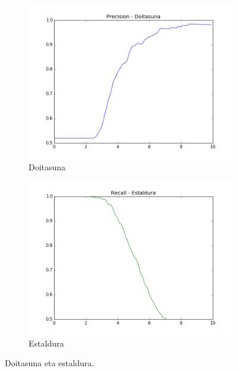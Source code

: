 \documentclass[information,article,submit,moreauthors,pdftex,10pt,a4paper]{Definitions/mdpi}
\begin{document}
\begin{figure}[H]
  \centering
  \begin{subfigure}[b]{0.48\linewidth}
    \includegraphics[width=\linewidth]{precision}
    \caption{Doitasuna}
      \label{fig:doi}
  \end{subfigure}
  \begin{subfigure}[b]{0.48\linewidth}
    \includegraphics[width=\linewidth]{recall}
    \caption{Estaldura}
      \label{fig:est}
  \end{subfigure}
  \caption{Doitasuna eta estaldura.}
  \label{fig:doi est}
\end{figure}
\end{document}
